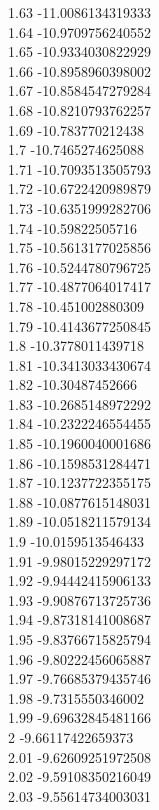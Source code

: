 {1.63	-11.0086134319333\\
1.64	-10.9709756240552\\
1.65	-10.9334030822929\\
1.66	-10.8958960398002\\
1.67	-10.8584547279284\\
1.68	-10.8210793762257\\
1.69	-10.783770212438\\
1.7	-10.7465274625088\\
1.71	-10.7093513505793\\
1.72	-10.6722420989879\\
1.73	-10.6351999282706\\
1.74	-10.59822505716\\
1.75	-10.5613177025856\\
1.76	-10.5244780796725\\
1.77	-10.4877064017417\\
1.78	-10.451002880309\\
1.79	-10.4143677250845\\
1.8	-10.3778011439718\\
1.81	-10.3413033430674\\
1.82	-10.30487452666\\
1.83	-10.2685148972292\\
1.84	-10.2322246554455\\
1.85	-10.1960040001686\\
1.86	-10.1598531284471\\
1.87	-10.1237722355175\\
1.88	-10.0877615148031\\
1.89	-10.0518211579134\\
1.9	-10.0159513546433\\
1.91	-9.98015229297172\\
1.92	-9.94442415906133\\
1.93	-9.90876713725736\\
1.94	-9.87318141008687\\
1.95	-9.83766715825794\\
1.96	-9.80222456065887\\
1.97	-9.76685379435746\\
1.98	-9.7315550346002\\
1.99	-9.69632845481166\\
2	-9.66117422659373\\
2.01	-9.62609251972508\\
2.02	-9.59108350216049\\
2.03	-9.55614734003031\\
}
